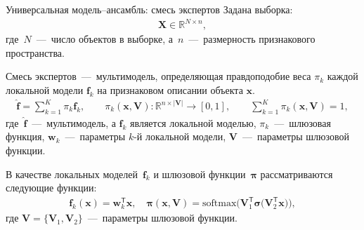 \documentclass[9pt,pdf,hyperref={unicode}]{beamer}
\begin{document}
\begin{frame}{Универсальная модель--ансамбль: смесь экспертов}
\justifying
Задана выборка:
\begin{equation*}
\begin{aligned}
\textbf{X} \in \mathbb{R}^{N \times n},
\end{aligned}
\end{equation*}
где~$N$~---~число объектов в выборке, а~$n$~---~размерность признакового пространства.


\begin{definition}
Смесь экспертов~---~мультимодель, определяющая правдоподобие веса $\pi_k$ каждой локальной модели $\textbf{f}_k$ на признаковом описании объекта $\textbf{x}$.
\begin{equation*}
\begin{aligned}
\hat{\mathbf{f}} = \sum_{k=1}^{K}\pi_{k}\mathbf{f}_k, \qquad \pi_{k}\left(\mathbf{x}, \mathbf{V}\right):\mathbb{R}^{n\times \left|\mathbf{V}\right|} \to [0, 1], \qquad \sum_{k=1}^{K}\pi_{k}\left(\mathbf{x}, \mathbf{V}\right) = 1,
\end{aligned}
\end{equation*}
где~$\hat{\mathbf{f}}$~---~мультимодель, а $\mathbf{f}_k$ является локальной моделью, $\pi_k$~---~шлюзовая функция, $\mathbf{w}_k$~---~параметры $k$-й локальной модели, $\mathbf{V}$~---~параметры шлюзовой функции.
\end{definition}

В качестве локальных моделей~$\mathbf{f}_k$ и шлюзовой функции~$\bm{\pi}$ рассматриваются следующие функции:
\begin{equation*}
\begin{aligned}
\mathbf{f}_k\left(\textbf{x}\right) = \textbf{w}_k^{\mathsf{T}}\textbf{x}, \quad
\bm{\pi}\left(\mathbf{x}, \mathbf{V}\right) = \text{softmax}\bigr(\mathbf{V}_{1}^{\mathsf{T}}\bm{\sigma}\bigr(\mathbf{V}_2^{\mathsf{T}}\mathbf{x}\bigr)\bigr),
\end{aligned}
\end{equation*}
где $\mathbf{V} = \bigr\{\mathbf{V}_1, \mathbf{V}_2\bigr\}$~---~параметры шлюзовой функции.


\end{frame}
\end{document}
